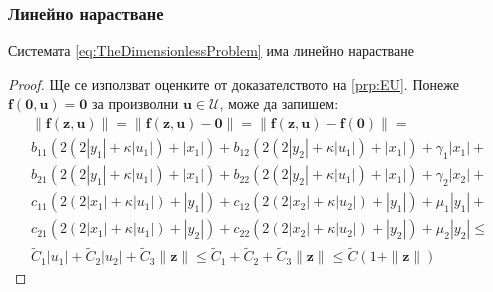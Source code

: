 \subsubsection{Линейно нарастване}
\begin{proposition}
  Системата \ref{eq:TheDimensionlessProblem} има линейно нарастване
\end{proposition}

\begin{proof}
  Ще се използват оценките от доказателството на \ref{prp:EU}.
  Понеже $\mathbf{f}(\mathbf{0}, \mathbf{u}) = \mathbf{0}$ за произволни $\mathbf{u} \in \mathscr{U}$, може да запишем:
  \begin{multline}
    \|\mathbf{f}(\mathbf{z}, \mathbf{u})\| = \|\mathbf{f}(\mathbf{z}, \mathbf{u}) - \mathbf{0}\| = \|\mathbf{f}(\mathbf{z}, \mathbf{u}) - \mathbf{f}(\mathbf{0})\| = \\
    b_{11} (2 (2 |y_1| + \kappa |u_1|) + |x_1|) + b_{12}(2  (2 |y_2| + \kappa |u_1|) +  |x_1|) + \gamma_1 |x_1| + \\
    b_{21} (2  (2|y_1| +  \kappa |u_1|) +  |x_1|) + b_{22} (2  (2|y_2| +  \kappa |u_1|) +  |x_1|) + \gamma_2 |x_2| + \\
    c_{11}(2  (2|x_1| +  \kappa |u_1|) +  |y_1|) + c_{12} (2  (2|x_2| +  \kappa |u_2|) +  |y_1|) + \mu_1 |y_1| + \\
    c_{21} (2  (2|x_1| +  \kappa |u_1|) +  |y_2|) + c_{22} (2  (2|x_2| +  \kappa |u_2|) +  |y_2|) + \mu_2 |y_2| \leq \\
    \tilde{C}_1|u_1| + \tilde{C}_2|u_2| + \tilde{C}_3 \|\mathbf{z}\| \leq \tilde{C}_1 + \tilde{C}_2 + \tilde{C}_3 \|\mathbf{z}\| \leq \tilde{C}(1 + \|\mathbf{z}\|)
  \end{multline}

\end{proof}


